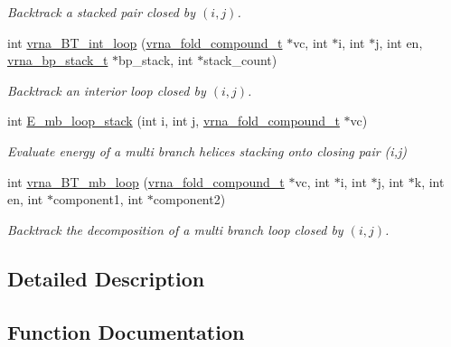 \begin{DoxyCompactItemize}
\begin{DoxyCompactList}\small\item\em Backtrack a stacked pair closed by $ (i,j) $. \end{DoxyCompactList}\item 
\hypertarget{group__loops_ga849b7dc373b6c0b029672e16a7e52053}{}int \hyperlink{group__loops_ga849b7dc373b6c0b029672e16a7e52053}{vrna\+\_\+\+B\+T\+\_\+int\+\_\+loop} (\hyperlink{group__fold__compound_ga1b0cef17fd40466cef5968eaeeff6166}{vrna\+\_\+fold\+\_\+compound\+\_\+t} $\ast$vc, int $\ast$i, int $\ast$j, int en, \hyperlink{group__data__structures_gaa651bda42e7692f08cb603cd6834b0ee}{vrna\+\_\+bp\+\_\+stack\+\_\+t} $\ast$bp\+\_\+stack, int $\ast$stack\+\_\+count)\label{group__loops_ga849b7dc373b6c0b029672e16a7e52053}

\begin{DoxyCompactList}\small\item\em Backtrack an interior loop closed by $ (i,j) $. \end{DoxyCompactList}\item 
int \hyperlink{group__loops_ga81d73d23f480f84df8cfd0042c032503}{E\+\_\+mb\+\_\+loop\+\_\+stack} (int i, int j, \hyperlink{group__fold__compound_ga1b0cef17fd40466cef5968eaeeff6166}{vrna\+\_\+fold\+\_\+compound\+\_\+t} $\ast$vc)
\begin{DoxyCompactList}\small\item\em Evaluate energy of a multi branch helices stacking onto closing pair (i,j) \end{DoxyCompactList}\item 
int \hyperlink{group__loops_ga9cb520ddfd8b3a48089a7910b045d06b}{vrna\+\_\+\+B\+T\+\_\+mb\+\_\+loop} (\hyperlink{group__fold__compound_ga1b0cef17fd40466cef5968eaeeff6166}{vrna\+\_\+fold\+\_\+compound\+\_\+t} $\ast$vc, int $\ast$i, int $\ast$j, int $\ast$k, int en, int $\ast$component1, int $\ast$component2)
\begin{DoxyCompactList}\small\item\em Backtrack the decomposition of a multi branch loop closed by $ (i,j) $. \end{DoxyCompactList}\end{DoxyCompactItemize}


\subsection{Detailed Description}


\subsection{Function Documentation}
\hypertarget{group__loops_ga05c6288c5a79d3bd5ad6d33c1bb34bd0}{}

